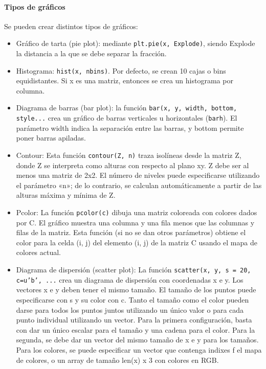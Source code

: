 \paragraph{Tipos de gráficos}
Se pueden crear distintos tipos de gráficos:
\begin{itemize}
\item Gráfico de tarta (pie plot): mediante \texttt{plt.pie(x, Explode)}, siendo Explode la distancia a la que se debe separar la fracción.
\item Histograma: \texttt{hist(x, nbins)}. Por defecto, se crean 10 cajas o bins equidistantes. Si x es una matriz, entonces se crea un histograma por columna.
\item Diagrama de barras (bar plot): la función \texttt{bar(x, y, width, bottom, style...} crea un gráfico de barras verticales u horizontales (\texttt{barh}). El parámetro width indica la separación entre las barras, y bottom permite poner barras apiladas.
\item Contour: Esta función \texttt{contour(Z, n)} traza isolíneas desde la matriz Z, donde Z se interpreta como alturas con respecto al plano xy. Z debe ser al menos una matriz de 2x2. El número de niveles puede especificarse utilizando el parámetro «n»; de lo contrario, se calculan automáticamente a partir de las alturas máxima y mínima de Z.
\item Pcolor: La función \texttt{pcolor(c)} dibuja una matriz coloreada con colores dados por C. El gráfico muestra una columna y una fila menos que las columnas y filas de la matriz. Esta función (si no se dan otros parámetros) obtiene el color para la celda (i, j) del elemento (i, j) de la matriz C usando el mapa de colores actual.
\item Diagrama de dispersión (scatter plot): La función \texttt{scatter(x, y, s = 20, c=u'b', ...} crea un diagrama de dispersión con coordenadas x e y. Los vectores x e y deben tener el mismo tamaño. El tamaño de los puntos puede especificarse con s y su color con c. Tanto el tamaño como el color pueden darse para todos los puntos juntos utilizando un único valor o para cada punto individual utilizando un vector. Para la primera configuración, basta con dar un único escalar para el tamaño y una cadena para el color. Para la segunda, se debe dar un vector del mismo tamaño de x e y para los tamaños. Para los colores, se puede especificar un vector que contenga indixes f el mapa de colores, o un array de tamaño len(x) x 3 con colores en RGB.
\end{itemize}

